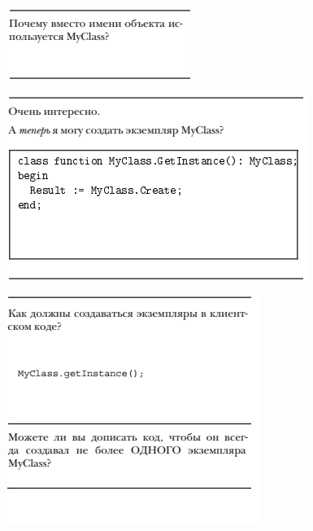 \documentclass{beamer}
\begin{document}
\begin{frame}
\begin{figure}[h]
\centering
\includegraphics[scale=1.0]{images/lec11-pic09.png}
\label{pic-sort}
\end{figure}
\end{frame}

\begin{frame}
\begin{figure}[h]
\centering
\includegraphics[scale=1.0]{images/lec11-pic10.png}
\label{pic-sort}
\end{figure}
\end{frame}

\begin{frame}
\begin{figure}[h]
\centering
\includegraphics[scale=1.0]{images/lec11-pic11.png}
\label{pic-sort}
\end{figure}
\end{frame}
\end{document}

